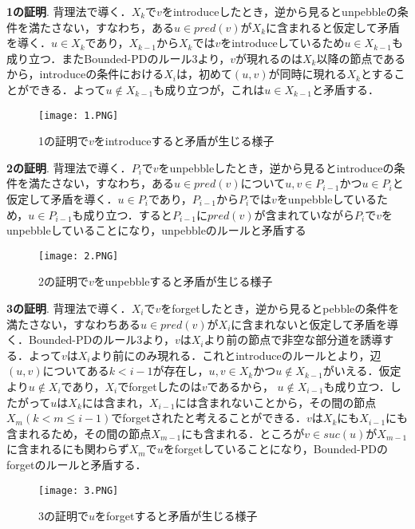 \documentclass{kuisthesis}           %
\begin{document}
 \textbf{1の証明}. 
 背理法で導く．$X_k$で$v$をintroduceしたとき，逆から見るとunpebbleの条件を満たさない，すなわち，ある$u \in pred(v)$が$X_k$に含まれると仮定して矛盾を導く．$u \in X_k$であり，$X_{k-1}$から$X_k$では$v$をintroduceしているため$u \in X_{k-1}$も成り立つ．またBounded-PDのルール3より，$v$が現れるのは$X_k$以降の節点であるから，introduceの条件における$X_i$は，初めて$(u, v)$が同時に現れる$X_k$とすることができる．よって$u \notin X_{k-1}$も成り立つが，これは$u \in X_{k-1}$と矛盾する．

 
 \begin{figure}[tbh]
 \centering
 \texttt{[image: 1.PNG]}
 \caption{1の証明で$v$をintroduceすると矛盾が生じる様子}
 \label{fig:1}
 \end{figure}



 \textbf{2の証明}. 
 背理法で導く．$P_i$で$v$をunpebbleしたとき，逆から見るとintroduceの条件を満たさない，すなわち，ある$u \in pred(v)$について$u, v \in P_{i-1}$かつ$u \in P_i$と仮定して矛盾を導く．$u \in P_i$であり，$P_{i-1}$から$P_i$では$v$をunpebbleしているため，$u \in P_{i-1}$も成り立つ．すると$P_{i-1}$に$pred(v)$が含まれていながら$P_i$で$v$をunpebbleしていることになり，unpebbleのルールと矛盾する

 
 \begin{figure}[tbh]
 \centering
 \texttt{[image: 2.PNG]}
 \caption{2の証明で$v$をunpebbleすると矛盾が生じる様子}
 \label{fig:2}
 \end{figure}


 \textbf{3の証明}.
  背理法で導く．$X_i$で$v$をforgetしたとき，逆から見るとpebbleの条件を満たさない，すなわちある$u \in pred(v)$が$X_i$に含まれないと仮定して矛盾を導く．Bounded-PDのルール3より，$v$は$X_i$より前の節点で非空な部分道を誘導する．よって$v$は$X_i$より前にのみ現れる．これとintroduceのルールとより，辺$(u, v)$についてある$k<i-1$が存在し，$u, v \in X_k$かつ$u \notin X_{k-1}$がいえる．仮定より$u \notin X_i$であり，$X_i$でforgetしたのは$v$であるから， $u \notin X_{i-1}$も成り立つ．したがって$u$は$X_k$には含まれ，$X_{i-1}$には含まれないことから，その間の節点$X_m (k < m \leq i-1)$でforgetされたと考えることができる．$v$は$X_k$にも$X_{i-1}$にも含まれるため，その間の節点$X_{m-1}$にも含まれる．ところが$v \in suc(u)$が$X_{m-1}$に含まれるにも関わらず$X_m$で$u$をforgetしていることになり，Bounded-PDのforgetのルールと矛盾する．

 
 \begin{figure}[tbh]
 \centering
 \texttt{[image: 3.PNG]}
 \caption{3の証明で$u$をforgetすると矛盾が生じる様子}
 \label{fig:3}
 \end{figure}
\end{document}
